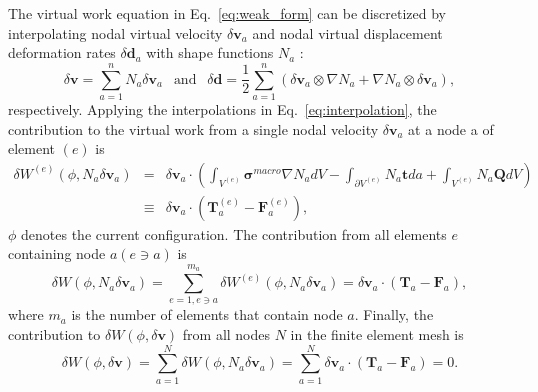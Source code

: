 \documentclass[12pt,aps,pre]{revtex4}
\begin{document}
The virtual work equation in Eq.\ \eqref{eq:weak_form} can be discretized by interpolating nodal virtual velocity $\delta \pmb{v}_a$ and nodal virtual displacement deformation rates $\delta \pmb{d}_a$ with shape functions $N_a$ \cite{JavierBonet:2008uxa}:
%
\begin{equation}
\delta \pmb{v} = \sum_{a=1}^n N_a \delta \pmb{v}_a \ \ \text{ and } \ \ \delta \pmb{d} = \frac{1}{2}\sum_{a=1}^n \left(\delta \pmb{v}_a \otimes \nabla N_a + \nabla N_a \otimes \delta \pmb{v}_a\right),
\label{eq:interpolation}
\end{equation}
%
respectively. Applying the interpolations in Eq.\ \eqref{eq:interpolation}, the contribution to the virtual work from a single nodal velocity $\delta \pmb{v}_a$ at a node a of element $(e)$ is 
%
\begin{eqnarray}
\delta W^{(e)}(\phi, N_a \delta \pmb{v}_a) &=& \delta \pmb{v}_a \cdot \left( \int_{V^{(e)}}\pmb{\sigma}^{macro} \nabla N_a dV - \int_{\partial V^{(e)}} N_a \pmb{t} da + \int_{V^{(e)}} N_a \pmb{Q}dV \right) \nonumber\\
%
&\equiv& \delta \pmb{v}_a \cdot \left(\pmb{T}^{(e)}_a - \pmb{F}^{(e)}_a\right),
\end{eqnarray}
%
$\phi$ denotes the current configuration. The contribution from all elements $e$ containing node $a (e \ni a)$ is 
%
\begin{equation}
\delta W(\phi, N_a \delta \pmb{v}_a) = \sum_{e=1, e\ni a}^{m_a} \delta W^{(e)}(\phi, N_a \delta \pmb{v}_a) = \delta \pmb{v}_a \cdot \left(\pmb{T}_a - \pmb{F}_a\right),
\end{equation}
%
where $m_a$ is the number of elements that contain node $a$. Finally, the contribution to $\delta W(\phi,\delta \pmb{v})$ from all nodes $N$ in the finite element mesh is
%
\begin{equation}
\delta W(\phi,\delta \pmb{v}) = \sum_{a=1}^N \delta W(\phi,N_a\delta\pmb{v}_a)=\sum_{a=1}^N \delta \pmb{v}_a \cdot \left(\pmb{T}_a - \pmb{F}_a\right) = 0.
\label{eq:weak_form_discretized}
\end{equation}
%
\end{document}

